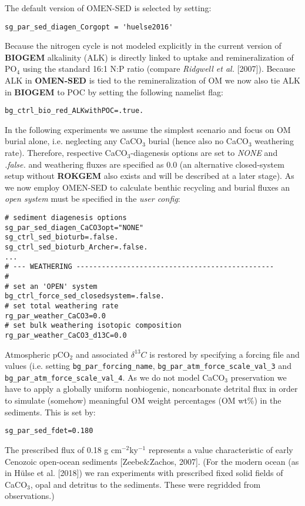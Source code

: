 \noindent The default version of OMEN-SED is selected by setting:
\vspace{-1mm}\begin{verbatim}
sg_par_sed_diagen_Corgopt = 'huelse2016'
\end{verbatim}\vspace{-1mm}
Because the nitrogen cycle is not modeled explicitly in the current version of \textbf{BIOGEM} alkalinity (ALK) is directly linked to uptake and remineralization of PO$_4$ using the standard 16:1 N:P ratio (compare \textit{Ridgwell et al.} [2007]).
Because ALK in \textbf{OMEN-SED} is tied to the remineralization of OM we now also tie ALK in \textbf{BIOGEM} to POC by setting the following namelist flag:
\vspace{-1mm}\begin{verbatim}
bg_ctrl_bio_red_ALKwithPOC=.true.
\end{verbatim}\vspace{-1mm}
In the following experiments we assume the simplest scenario and focus on OM burial alone, i.e. neglecting any CaCO$_3$ burial (hence also no CaCO$_3$ weathering rate). Therefore, respective CaCO$_3$-diagenesis options are set to \textit{NONE} and \textit{.false.} and weathering fluxes are specified as 0.0 (an alternative closed-system setup without \textbf{ROKGEM} also exists and will be described at a later stage).
As we now employ OMEN-SED to calculate benthic recycling and burial fluxes an \textit{open system} must be specified in the \textit{user config}:
\vspace{-1mm}\begin{verbatim}
# sediment diagenesis options
sg_par_sed_diagen_CaCO3opt="NONE"
sg_ctrl_sed_bioturb=.false.
sg_ctrl_sed_bioturb_Archer=.false.
...
# --- WEATHERING -----------------------------------------------
#
# set an 'OPEN' system
bg_ctrl_force_sed_closedsystem=.false.
# set total weathering rate
rg_par_weather_CaCO3=0.0
# set bulk weathering isotopic composition
rg_par_weather_CaCO3_d13C=0.0
\end{verbatim}\vspace{-1mm}
Atmospheric pCO$_2$ and associated \(\delta^{13}C\) is restored by specifying a forcing file and values (i.e. setting  \texttt{bg\_par\_forcing\_name}, \texttt{bg\_par\_atm\_force\_scale\_val\_3} and \texttt{bg\_par\_atm\_force\_scale\_val\_4}.
As we do not model CaCO$_3$ preservation we have to apply a globally uniform nonbiogenic, noncarbonate detrital flux in order to simulate (somehow) meaningful OM weight percentages (OM wt\%) in the sediments. This is set by:
\vspace{-1mm}\begin{verbatim}
sg_par_sed_fdet=0.180
\end{verbatim}\vspace{-1mm}
The prescribed flux of 0.18 g cm$^{-2}$ky$^{-1}$ represents a value characteristic of early Cenozoic open-ocean sediments [Zeebe\&Zachos, 2007]. (For the modern ocean (as in H\"ulse et al. [2018]) we ran experiments with prescribed fixed solid
fields of CaCO$_3$, opal and detritus to the sediments. These were regridded from observations.)

